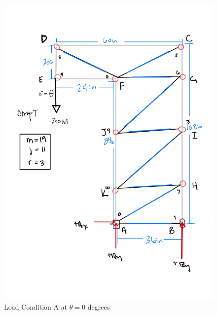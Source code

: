     \begin{figure}
    \centering
    \includegraphics[width=\textwidth]{con2_lca.jpg}
    \caption{Load Condition A at $\theta = 0$ degrees}
\end{figure}
